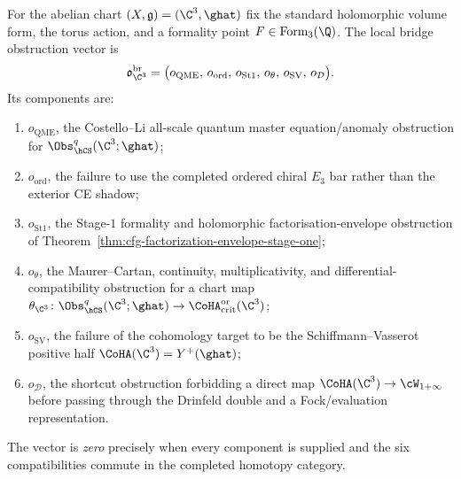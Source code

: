 \begin{definition}
\label{def:c3-local-bridge-obstruction-vector}
For the abelian chart $(X,\mathfrak g)=(\C^3,\ghat)$ fix the standard
holomorphic volume form, the torus action, and a formality point
$F\in\mathrm{Form}_3(\Q)$. The local bridge obstruction vector is
\[
 \mathfrak o_{\C^3}^{\mathrm{br}}
 =
 \bigl(
 o_{\mathrm{QME}},\,
 o_{\mathrm{ord}},\,
 o_{\mathrm{St1}},\,
 o_{\theta},\,
 o_{\mathrm{SV}},\,
 o_{\mathcal D}
 \bigr).
\]
Its components are:
\begin{enumerate}
\item $o_{\mathrm{QME}}$, the Costello--Li all-scale quantum master
equation/anomaly obstruction for $\Obs_{\hCS}^{q}(\C^3;\ghat)$;
\item $o_{\mathrm{ord}}$, the failure to use the completed ordered
chiral $E_3$ bar rather than the exterior CE shadow;
\item $o_{\mathrm{St1}}$, the Stage-$1$ formality and holomorphic
factorisation-envelope obstruction of
Theorem~\ref{thm:cfg-factorization-envelope-stage-one};
\item $o_{\theta}$, the Maurer--Cartan, continuity, multiplicativity,
and differential-compatibility obstruction for a chart map
$\theta_{\C^3}\colon\Obs_{\hCS}^{q}(\C^3;\ghat)\to
\CoHA_{\mathrm{crit}}^{\mathrm{or}}(\C^3)$;
\item $o_{\mathrm{SV}}$, the failure of the cohomology target to be the
Schiffmann--Vasserot positive half $\CoHA(\C^3)=Y^+(\ghat)$;
\item $o_{\mathcal D}$, the shortcut obstruction forbidding a direct
map $\CoHA(\C^3)\to\cW_{1+\infty}$ before passing through the Drinfeld
double and a Fock/evaluation representation.
\end{enumerate}
The vector is \emph{zero} precisely when every component is supplied and
the six compatibilities commute in the completed homotopy category.
\end{definition}

